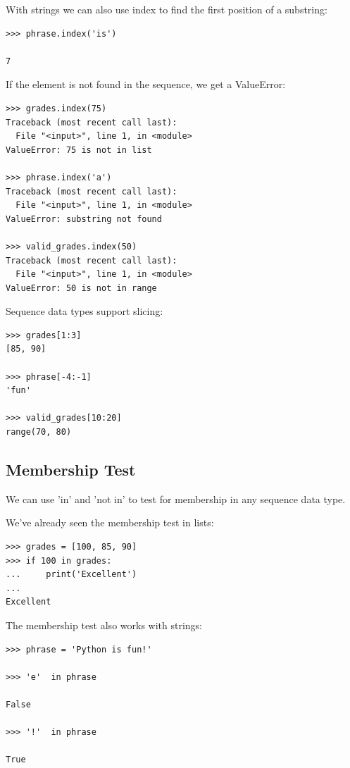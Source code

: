 \documentclass{article}
\begin{document}
With strings we can also use index to find the first position of a substring:

\begin{lstlisting}
>>> phrase.index('is')

7
\end{lstlisting}

If the element is not found in the sequence, we get a ValueError:

\begin{lstlisting}
>>> grades.index(75)
Traceback (most recent call last):
  File "<input>", line 1, in <module>
ValueError: 75 is not in list
 
>>> phrase.index('a')
Traceback (most recent call last):
  File "<input>", line 1, in <module>
ValueError: substring not found
 
>>> valid_grades.index(50)
Traceback (most recent call last):
  File "<input>", line 1, in <module>
ValueError: 50 is not in range
\end{lstlisting}

Sequence data types support slicing:

\begin{lstlisting}
>>> grades[1:3]
[85, 90]
 
>>> phrase[-4:-1]
'fun'
 
>>> valid_grades[10:20]
range(70, 80)
\end{lstlisting}

\subsection{Membership Test}

We can use 'in' and 'not in' to test for membership in any sequence data type.

We've already seen the membership test in lists:

\begin{lstlisting}
>>> grades = [100, 85, 90]
>>> if 100 in grades:
...     print('Excellent')
...     
Excellent
\end{lstlisting}

The membership test also works with strings:

\begin{lstlisting}
>>> phrase = 'Python is fun!'

>>> 'e'  in phrase

False

>>> '!'  in phrase

True
\end{lstlisting}
\end{document}
